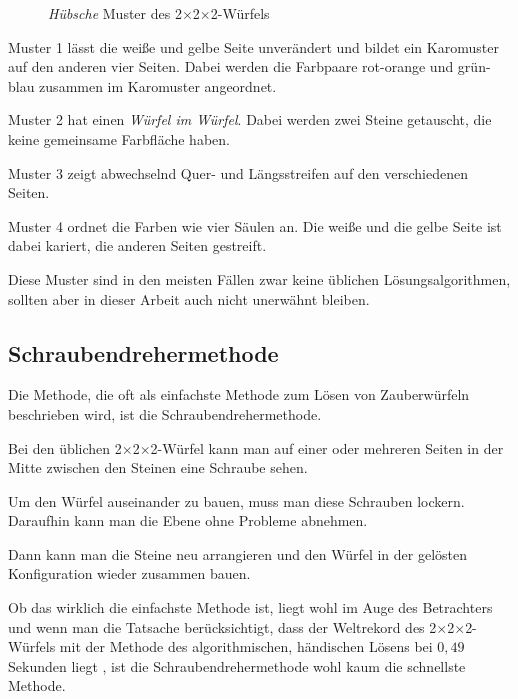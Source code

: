 \documentclass[12pt,a4paper, usenames, dvipsnames]{article}
\newcommand{\Ttwo}{2$\times$2$\times$2-}
\begin{document}
\begin{figure}[h]
\caption{\textit{Hübsche} Muster des \Ttwo Würfels}
\label{29}
\end{figure}

Muster 1 lässt die weiße und gelbe Seite unverändert und bildet ein Karomuster auf den anderen vier Seiten. Dabei werden die Farbpaare rot-orange und grün-blau zusammen im  Karomuster angeordnet.

Muster 2 hat einen \textit{Würfel im Würfel}. Dabei werden zwei Steine getauscht, die keine gemeinsame Farbfläche haben.

Muster 3 zeigt abwechselnd Quer- und Längsstreifen auf den verschiedenen Seiten.

Muster 4 ordnet die Farben wie vier Säulen an. Die weiße und die gelbe Seite ist dabei kariert, die anderen Seiten gestreift.


Diese Muster sind in den meisten Fällen zwar keine üblichen Lösungsalgorithmen, sollten aber in dieser Arbeit auch nicht unerwähnt bleiben.

%
%
%
%
%
%
%
%
%
%
%
%
%
%
%
%
%
%
%
\subsection*{Schraubendrehermethode}

Die Methode, die oft als einfachste Methode zum Lösen von Zauberwürfeln beschrieben wird, ist die Schraubendrehermethode.

Bei den üblichen \Ttwo Würfel kann man auf einer oder mehreren Seiten in der Mitte zwischen den Steinen eine Schraube sehen.

Um den Würfel auseinander zu bauen, muss man diese Schrauben lockern. Daraufhin kann man die Ebene ohne Probleme abnehmen. 

Dann kann man die Steine neu arrangieren und den Würfel in der gelösten Konfiguration wieder zusammen bauen.

Ob das wirklich die einfachste Methode ist, liegt wohl im Auge des Betrachters und wenn man die Tatsache berücksichtigt, dass der Weltrekord des \Ttwo Würfels mit der Methode des algorithmischen, händischen Lösens bei $0,49$ Sekunden liegt \cite{rekord}, ist die Schraubendrehermethode wohl kaum die schnellste Methode.

%
%
%
%
%
%
%
%
%
%
%
%
%
%
%
%
%
%
%
\newpage



\listoffigures

\newpage


\listoftables

\newpage


\printbibliography
\end{document}
